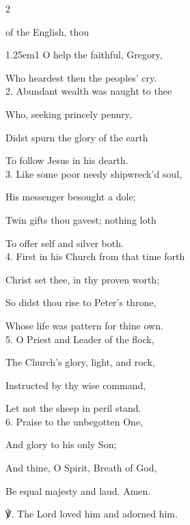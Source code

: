 \begin{paracol}{2}
\sloppy

\firstEvensong\label{GregoryEvensong}

\firstEvensongHymn

 of the English, thou

\begin{hangparas}{1.25em}{1}
O help the faithful, Gregory,

Who heardest then the peoples' cry.\\

2. Abundant wealth was naught to thee

Who, seeking princely penury,

Didst spurn the glory of the earth

To follow Jesus in his dearth.\\

3. Like some poor needy shipwreck'd soul,

His messenger besought a dole;

Twin gifts thou gavest; nothing loth

To offer self and silver both.\\

4. First in his Church from that time forth

Christ set thee, in thy proven worth;

So didst thou rise to Peter's throne,

Whose life was pattern for thine own.\\

5. O Priest and Leader of the flock,

The Church's glory, light, and rock,

Instructed by thy wise command,

Let not the sheep in peril stand.\\

6. Praise to the unbegotten One,

And glory to his only Son;

And thine, O Spirit, Breath of God,

Be equal majesty and laud. Amen.\\
\end{hangparas}

    ℣. The Lord loved him and adorned him.


\end{paracol}
